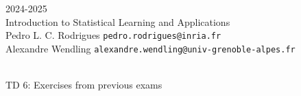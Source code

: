 \begin{flushleft}
 \hfill {} 2024-2025 \\
Introduction to Statistical Learning and Applications \\
Pedro L. C. Rodrigues   \hfill  \texttt{pedro.rodrigues@inria.fr} \\
Alexandre Wendling \hfill \texttt{alexandre.wendling@univ-grenoble-alpes.fr } \\

\HRuleTop\\
\begin{center}
\Large{TD 6: Exercises from previous exams}
\end{center}
\HRuleBottom
\end{flushleft}
